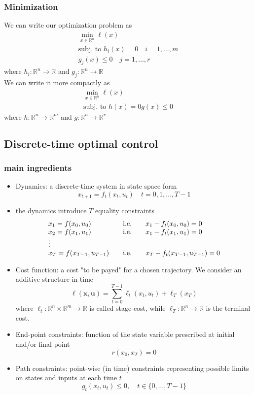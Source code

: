 \documentclass{book}
\newcommand{\R}{\mathbb{R}}
\begin{document}
\subsubsection{Minimization}
We can write our optimization problem as 
\begin{gather}
    \min_{x\in\R^n} \ell(x)\\
    \text{subj. to } h_i(x) = 0 \quad i=1,\dots,m\\
    g_j(x)\leq 0 \quad j=1,\dots,r
\end{gather}
where $h_i:\R^n\to\R$ and $g_j:\R^n\to\R$\\
We can write it more compactly as 
\begin{gather*}
    \min_{x\in\R^n} \ell(x)\\
    \text{subj. to } h(x) = 0 
    g(x)\leq 0 
\end{gather*}
where $h:\R^n\to\R^m$ and $g:\R^n\to\R^r$\\
\subsection{Discrete-time optimal control}
\subsubsection{main ingredients}
\begin{itemize}
    \item Dynamics: a discrete-time system in state space form 
        \[
            x_{t+1} = f_t(x_t,u_t) \quad t=0,1,\dots,T-1
        \]
    \item the dynamics introduce $T$ equality constraints 
        \[
            \begin{array}{l l l}
                x_1 = f(x_0,u_0) & \quad \text{i.e.} \quad& x_1-f_t(x_0,u_0)=0 \\
                x_2 = f(x_1,u_1) & \quad \text{i.e.} \quad & x_1-f_t(x_1,u_1)=0 \\
                \vdots \\
                x_T = f(x_{T-1},u_{T-1}) & \quad \text{i.e.} \quad & x_T-f_t(x_{T-1},u_{T-1})=0 \\
            \end{array}
        \] 
    \item Cost function: a cost "to be payed" for a chosen trajectory. We consider an additive structure in time 
        \[
            \ell(\mathbf{x},\mathbf{u}) = \displaystyle\sum_{t=0}^{T-1}\ell_t(x_t,u_t)+\ell_T(x_T)
        \]
        where $\ell_t:\R^n\times\R^m\to\R$ is called stage-cost, while $\ell_T:\R^n\to\R$ is the terminal cost. 
    \item End-point constraints: function of the state variable prescribed at initial and/or final point 
        \[
            r(x_0,x_T)=0
        \]
    \item Path constraints: point-wise (in time) constraints representing possible limits on states and inputs at each time $t$ 
        \[
            g_t(x_t,u_t)\leq 0, \quad t\in\{0,\dots,T-1\}
        \]
\end{itemize}
\end{document}
